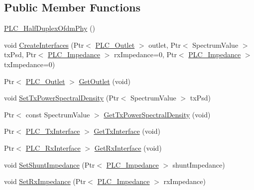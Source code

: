 \subsection*{\-Public \-Member \-Functions}
\begin{DoxyCompactItemize}
\item 
\hyperlink{classns3_1_1PLC__HalfDuplexOfdmPhy_a8f0b0301c3ee37a86495cbc7040c1eb8}{\-P\-L\-C\-\_\-\-Half\-Duplex\-Ofdm\-Phy} ()
\item 
void \hyperlink{classns3_1_1PLC__HalfDuplexOfdmPhy_aa8188f7d1e0a2f97486764f372dd3ec5}{\-Create\-Interfaces} (\-Ptr$<$ \hyperlink{classns3_1_1PLC__Outlet}{\-P\-L\-C\-\_\-\-Outlet} $>$ outlet, \-Ptr$<$ \-Spectrum\-Value $>$ tx\-Psd, \-Ptr$<$ \hyperlink{classns3_1_1PLC__ValueBase}{\-P\-L\-C\-\_\-\-Impedance} $>$ rx\-Impedance=0, \-Ptr$<$ \hyperlink{classns3_1_1PLC__ValueBase}{\-P\-L\-C\-\_\-\-Impedance} $>$ tx\-Impedance=0)
\item 
\-Ptr$<$ \hyperlink{classns3_1_1PLC__Outlet}{\-P\-L\-C\-\_\-\-Outlet} $>$ \hyperlink{classns3_1_1PLC__HalfDuplexOfdmPhy_a2a58277a4d03c70d20e986d0ff3e7c98}{\-Get\-Outlet} (void)
\item 
void \hyperlink{classns3_1_1PLC__HalfDuplexOfdmPhy_a6181d4b225c735f11a032580744ab7f0}{\-Set\-Tx\-Power\-Spectral\-Density} (\-Ptr$<$ \-Spectrum\-Value $>$ tx\-Psd)
\item 
\-Ptr$<$ const \-Spectrum\-Value $>$ \hyperlink{classns3_1_1PLC__HalfDuplexOfdmPhy_a585258d85da1a323b303e0bc7667d060}{\-Get\-Tx\-Power\-Spectral\-Density} (void)
\item 
\-Ptr$<$ \hyperlink{classns3_1_1PLC__TxInterface}{\-P\-L\-C\-\_\-\-Tx\-Interface} $>$ \hyperlink{classns3_1_1PLC__HalfDuplexOfdmPhy_a8349f22e4ea1d1a3741ee9d637a46e19}{\-Get\-Tx\-Interface} (void)
\item 
\-Ptr$<$ \hyperlink{classns3_1_1PLC__RxInterface}{\-P\-L\-C\-\_\-\-Rx\-Interface} $>$ \hyperlink{classns3_1_1PLC__HalfDuplexOfdmPhy_a11ca81cdba9558972946a332fb6c3b9d}{\-Get\-Rx\-Interface} (void)
\item 
void \hyperlink{classns3_1_1PLC__HalfDuplexOfdmPhy_acbab033f2353b868ecbfdd23239407af}{\-Set\-Shunt\-Impedance} (\-Ptr$<$ \hyperlink{classns3_1_1PLC__ValueBase}{\-P\-L\-C\-\_\-\-Impedance} $>$ shunt\-Impedance)
\item 
void \hyperlink{classns3_1_1PLC__HalfDuplexOfdmPhy_a55a7d4f09175852d51ea067e3cb76123}{\-Set\-Rx\-Impedance} (\-Ptr$<$ \hyperlink{classns3_1_1PLC__ValueBase}{\-P\-L\-C\-\_\-\-Impedance} $>$ rx\-Impedance)
\item 

\end{DoxyCompactItemize}
